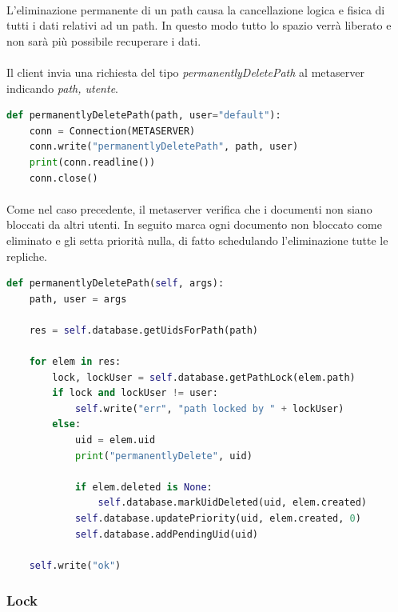 \documentclass{article}
\begin{document}
\paragraph{} L'eliminazione permanente di un path causa la cancellazione logica e fisica di tutti i dati relativi ad un path. In questo modo tutto lo spazio verrà liberato e non sarà più possibile recuperare i dati. 

\paragraph{} Il client invia una richiesta del tipo \emph{permanentlyDeletePath} al metaserver indicando \emph{path, utente}.

\begin{lstlisting}[language=Python, title=Codice]
def permanentlyDeletePath(path, user="default"):
    conn = Connection(METASERVER)
    conn.write("permanentlyDeletePath", path, user)
    print(conn.readline())
    conn.close()
\end{lstlisting}

\paragraph{} Come nel caso precedente, il metaserver verifica che i documenti non siano bloccati da altri utenti. In seguito marca ogni documento non bloccato come eliminato e gli setta priorità nulla, di fatto schedulando l'eliminazione tutte le repliche.

\begin{lstlisting}[language=Python, title=Codice]
def permanentlyDeletePath(self, args):
    path, user = args

    res = self.database.getUidsForPath(path)

    for elem in res:
        lock, lockUser = self.database.getPathLock(elem.path)
        if lock and lockUser != user:
            self.write("err", "path locked by " + lockUser)
        else:
            uid = elem.uid
            print("permanentlyDelete", uid)

            if elem.deleted is None:
                self.database.markUidDeleted(uid, elem.created)
            self.database.updatePriority(uid, elem.created, 0)
            self.database.addPendingUid(uid)

    self.write("ok")
\end{lstlisting}

\subsubsection{Lock}
\end{document}
